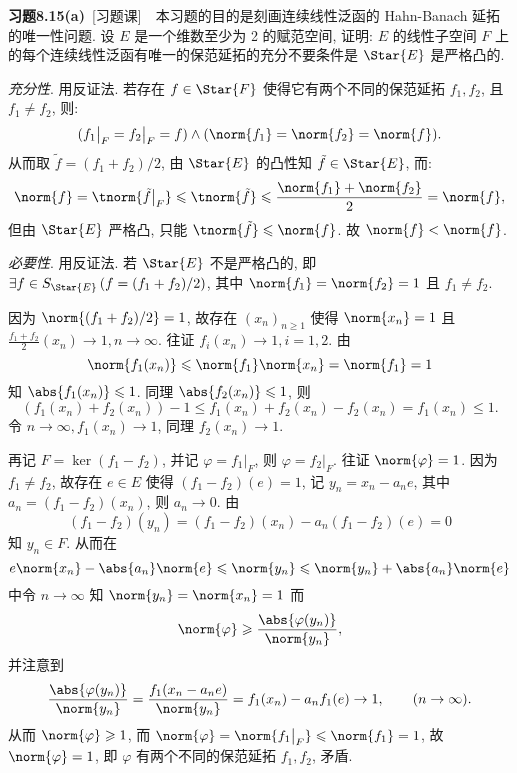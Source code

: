 	\textbf{习题8.15(a)}\ [习题课]\ \ 本习题的目的是刻画连续线性泛函的 Hahn-Banach 延拓的唯一性问题. 设 $ E $ 是一个维数至少为 2 的赋范空间, 证明: $ E $ 的线性子空间 $ F $ 上的每个连续线性泛函有唯一的保范延拓的充分不要条件是 $ \Star{E} $ 是严格凸的.
	
	\begin{answer}
		\textsl{充分性}. 用反证法. 若存在 $ f\in \Star{F} $ 使得它有两个不同的保范延拓 $ f_{1}, f_{2} $, 且 $ f_{1}\ne f_{2} $, 则:
		\[
			(f_{1}\big|_{F}=f_{2}\big|_{F}=f)\land (\norm{f_{1}}=\norm{f_{2}}=\norm{f}).
		\]
		从而取 $ \tilde{f}=(f_{1}+f_{2})/2 $, 由 $ \Star{E} $ 的凸性知 $ \tilde{f}\in\Star{E} $, 而:
		\[
			\norm{f}=\tnorm{\tilde{f}\big|_{F}}\leqslant\tnorm{\tilde{f}}\leqslant\frac{\norm{f_{1}}+\norm{f_{2}}}{2}=\norm{f},
		\]
		但由 $ \Star{E} $ 严格凸, 只能 $ \tnorm{\tilde{f}}\leqslant\norm{f} $. 故 $ \norm{f}<\norm{f} $.

		\textsl{必要性}. 用反证法. 若 $ \Star{E} $ 不是严格凸的, 即 $ \exists f\in S_{\Star{E}}\,(f=(f_{1}+f_{2})/2) $, 其中 $ \norm{f_{1}}=\norm{f_{2}}=1 $ 且 $ f_{1}\ne f_{2} $.
		
		因为 $ \norm{(f_{1}+f_{2})/2}=1 $, 故存在 $ (x_{n})_{n\geqslant1} $ 使得 $ \norm{x_{n}}=1 $ 且 $ \frac{f_{1}+f_{2}}{2}(x_{n})\to 1, n\to\infty $. 往证 $ f_{i}(x_{n})\to1, i=1, 2 $. 由
		\[
			\norm{f_{1}(x_{n})}\leqslant\norm{f_{1}}\norm{x_{n}}=\norm{f_{1}}=1
		\]
		知 $ \abs{f_{1}(x_{n})}\leqslant1 $. 同理 $ \abs{f_{2}(x_{n})}\leqslant1 $, 则
		\[
			(f_{1}(x_{n})+f_{2}(x_{n}))-1\leqslant f_{1}(x_{n})+f_{2}(x_{n})-f_{2}(x_{n})=f_{1}(x_{n})\leqslant1.
		\]
		令 $ n\to \infty, f_{1}(x_{n})\to 1 $, 同理 $ f_{2}(x_{n})\to1 $.

		再记 $ F=\ker(f_{1}-f_{2}) $, 并记 $ \varphi=f_{1}\big|_{F} $, 则 $ \varphi=f_{2}\big|_{F} $. 往证 $ \norm{\varphi}=1 $. 因为 $ f_{1}\ne f_{2} $, 故存在 $ e\in E $ 使得 $ (f_{1}-f_{2})(e)=1 $, 记 $ y_{n}=x_{n}-a_{n}e $, 其中 $ a_{n}=(f_{1}-f_{2})(x_{n}) $, 则 $ a_{n}\to0 $. 由
		\[
			(f_{1}-f_{2})(y_{n})=(f_{1}-f_{2})(x_{n})-a_{n}(f_{1}-f_{2})(e)=0
		\]
		知 $ y_{n}\in F $. 从而在
		\[
			e\norm{x_{n}}-\abs{a_{n}}\norm{e}\leqslant\norm{y_{n}}\leqslant\norm{y_{n}}+\abs{a_{n}}\norm{e}
		\]
		中令 $ n\to\infty $ 知 $ \norm{y_{n}}=\norm{x_{n}}=1 $ 而
		\[
			\norm{\varphi}\geqslant\frac{\abs{\varphi(y_{n})}}{\norm{y_{n}}},
		\]
		并注意到
		\[
			\frac{\abs{\varphi(y_{n})}}{\norm{y_{n}}}=\frac{f_{1}(x_{n}-a_{n}e)}{\norm{y_{n}}}=f_{1}(x_{n})-a_{n}f_{1}(e)\to 1,\qquad (n\to\infty).
		\]
		从而 $ \norm{\varphi}\geqslant1 $, 而 $ \norm{\varphi}=\norm{f_{1}\big|_{F}}\leqslant\norm{f_{1}}=1 $, 故 $ \norm{\varphi}=1 $, 即 $ \varphi $ 有两个不同的保范延拓 $ f_{1}, f_{2} $, 矛盾.\qedhere
	\end{answer}

